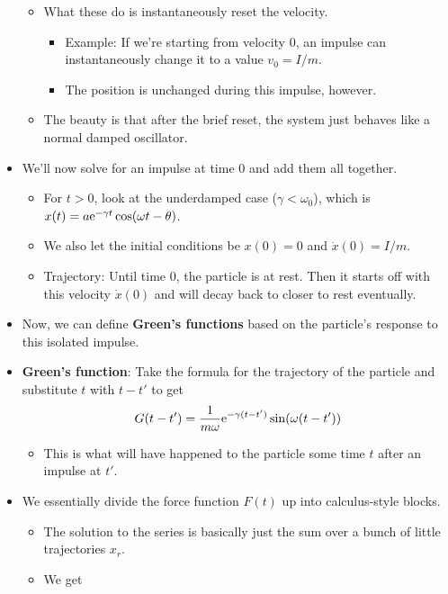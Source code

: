\documentclass[../notes.tex]{subfiles}
\begin{document}
\begin{itemize}
\begin{itemize}
        \item What these do is instantaneously reset the velocity.
        \begin{itemize}
            \item Example: If we're starting from velocity 0, an impulse can instantaneously change it to a value $v_0=I/m$.
            \item The position is unchanged during this impulse, however.
        \end{itemize}
        \item The beauty is that after the brief reset, the system just behaves like a normal damped oscillator.
    \end{itemize}
    \item We'll now solve for an impulse at time 0 and add them all together.
    \begin{itemize}
        \item For $t>0$, look at the underdamped case ($\gamma<\omega_0$), which is $x(t)=a\e[-\gamma t]\cos(\omega t-\theta)$.
        \item We also let the initial conditions be $x(0)=0$ and $\dot{x}(0)=I/m$.
        \item Trajectory: Until time 0, the particle is at rest. Then it starts off with this velocity $\dot{x}(0)$ and will decay back to closer to rest eventually.
    \end{itemize}
    \item Now, we can define \textbf{Green's functions} based on the particle's response to this isolated impulse.
    \item \textbf{Green's function}: Take the formula for the trajectory of the particle and substitute $t$ with $t-t'$ to get
    \begin{equation*}
        G(t-t') = \frac{1}{m\omega}\e[-\gamma(t-t')]\sin(\omega(t-t'))
    \end{equation*}
    \begin{itemize}
        \item This is what will have happened to the particle some time $t$ after an impulse at $t'$.
    \end{itemize}
    \item We essentially divide the force function $F(t)$ up into calculus-style blocks.
    \begin{itemize}
        \item The solution to the series is basically just the sum over a bunch of little trajectories $x_r$.
        \item We get

\end{itemize}
\end{itemize}
\end{document}
